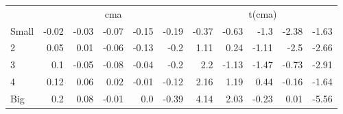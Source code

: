 \begin{table}[!ht]
\begin{tabular}{lrrrrrrrrrr}
  

      & \multicolumn{5}{c}{cma} & \multicolumn{5}{c}{t(cma)} \\
    \cmidrule(r){2-6} \cmidrule(r){7-11}
      Small  & -0.02  & -0.03  & -0.07  & -0.15  & -0.19   & -0.37  & -0.63  & -1.3  & -2.38  & -1.63  \\
          2  & 0.05  & 0.01  & -0.06  & -0.13  & -0.2   & 1.11  & 0.24  & -1.11  & -2.5  & -2.66  \\
          3  & 0.1  & -0.05  & -0.08  & -0.04  & -0.2   & 2.2  & -1.13  & -1.47  & -0.73  & -2.91  \\
          4  & 0.12  & 0.06  & 0.02  & -0.01  & -0.12   & 2.16  & 1.19  & 0.44  & -0.16  & -1.64  \\
      Big    & 0.2  & 0.08  & -0.01  & 0.0  & -0.39   & 4.14  & 2.03  & -0.23  & 0.01  & -5.56  \\

  

  \bottomrule
\end{tabular}
\label{tbl:25_Size_Vol_FF2016b}
\end{table}